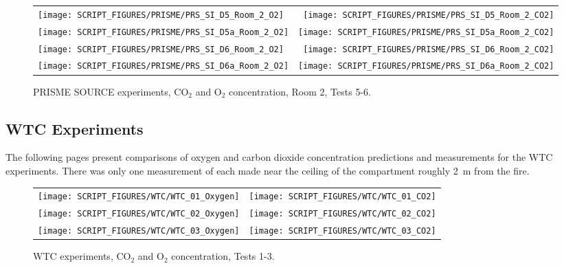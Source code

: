 \begin{figure}[p]
\begin{tabular*}{\textwidth}{l@{\extracolsep{\fill}}r}
\texttt{[image: SCRIPT\_FIGURES/PRISME/PRS\_SI\_D5\_Room\_2\_O2]} &
\texttt{[image: SCRIPT\_FIGURES/PRISME/PRS\_SI\_D5\_Room\_2\_CO2]} \\
\texttt{[image: SCRIPT\_FIGURES/PRISME/PRS\_SI\_D5a\_Room\_2\_O2]} &
\texttt{[image: SCRIPT\_FIGURES/PRISME/PRS\_SI\_D5a\_Room\_2\_CO2]} \\
\texttt{[image: SCRIPT\_FIGURES/PRISME/PRS\_SI\_D6\_Room\_2\_O2]} &
\texttt{[image: SCRIPT\_FIGURES/PRISME/PRS\_SI\_D6\_Room\_2\_CO2]} \\
\texttt{[image: SCRIPT\_FIGURES/PRISME/PRS\_SI\_D6a\_Room\_2\_O2]} &
\texttt{[image: SCRIPT\_FIGURES/PRISME/PRS\_SI\_D6a\_Room\_2\_CO2]}
\end{tabular*}
\caption{PRISME SOURCE experiments, CO$_2$ and O$_2$ concentration, Room 2, Tests 5-6.}
\label{PRISME_SOURCE_Gas_2}
\end{figure}

\clearpage


\subsection{WTC Experiments}

The following pages present comparisons of oxygen and carbon dioxide concentration predictions and measurements for the
WTC experiments. There was only one measurement of each made near the ceiling of the compartment roughly 2~m from the fire.


\begin{figure}[h]
\begin{tabular*}{\textwidth}{l@{\extracolsep{\fill}}r}
\texttt{[image: SCRIPT\_FIGURES/WTC/WTC\_01\_Oxygen]} &
\texttt{[image: SCRIPT\_FIGURES/WTC/WTC\_01\_CO2]} \\
\texttt{[image: SCRIPT\_FIGURES/WTC/WTC\_02\_Oxygen]} &
\texttt{[image: SCRIPT\_FIGURES/WTC/WTC\_02\_CO2]} \\
\texttt{[image: SCRIPT\_FIGURES/WTC/WTC\_03\_Oxygen]} &
\texttt{[image: SCRIPT\_FIGURES/WTC/WTC\_03\_CO2]}
\end{tabular*}
\caption{WTC experiments, CO$_2$ and O$_2$ concentration, Tests 1-3.}
\label{NIST_WTC_Oxygen_CO2_1}
\end{figure}

